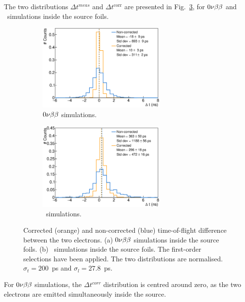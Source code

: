 The two distributions $\Delta t^{meas}$ and $\Delta t^{\text{corr}}$ are presented in Fig.~\ref{fig:delta_t}, for $0\nu\beta\beta$ and \Tl\ simulations inside the source foils.
\begin{figure}[!h]
\centering
\begin{subfigure}[t]{1.\textwidth}
  \centering
  \includegraphics[width=0.7\textwidth]{timedifference/fig_timediff/0nubb_delta_t.eps}
  \captionsetup{justification=justified}
  \caption{$0\nu\beta\beta$ simulations.
    \label{subfig:0nubb_delta_t}}
\end{subfigure}
\hfill
\begin{subfigure}[t]{1.\textwidth}
  \centering
  \includegraphics[width=0.7\textwidth]{timedifference/fig_timediff/208Tl_delta_t.eps}
  \captionsetup{justification=justified}
  \caption{\Tl\ simulations.
    \label{subfig:208Tl_delta_t}}
\end{subfigure}
\caption{Corrected (orange) and non-corrected (blue) time-of-flight difference between the two electrons.
  (a) $0\nu\beta\beta$ simulations inside the source foils.
  (b) \Tl\ simulations inside the source foils.
  The first-order selections have been applied.
  The two distributions are normalised.
  $\sigma_{t}=200$~ps and $\sigma_{l}=27.8$~ps.
  \label{fig:delta_t}}
\end{figure}
For $0\nu\beta\beta$ simulations, the $\Delta t^{corr}$ distribution is centred around zero, as the two electrons are emitted simultaneously inside the source.
